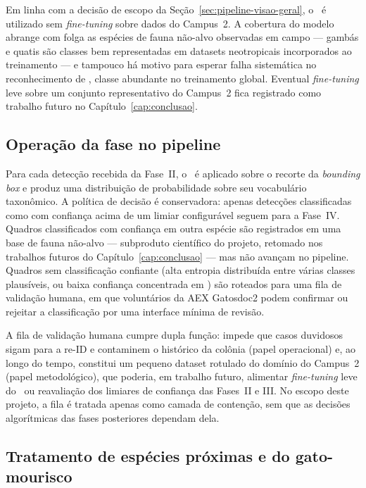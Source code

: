 Em linha com a decisão de escopo da Seção~\ref{sec:pipeline-visao-geral}, o \modeloSN~é utilizado sem \emph{fine-tuning} sobre dados do Campus~2. A cobertura do modelo abrange com folga as espécies de fauna não-alvo observadas em campo --- gambás e quatis são classes bem representadas em datasets neotropicais incorporados ao treinamento --- e tampouco há motivo para esperar falha sistemática no reconhecimento de , classe abundante no treinamento global. Eventual \emph{fine-tuning} leve sobre um conjunto representativo do Campus~2 fica registrado como trabalho futuro no Capítulo~\ref{cap:conclusao}.

\subsection*{Operação da fase no pipeline}

Para cada detecção recebida da Fase~II, o \modeloSN~é aplicado sobre o recorte da \emph{bounding box} e produz uma distribuição de probabilidade sobre seu vocabulário taxonômico. A política de decisão é conservadora: apenas detecções classificadas como  com confiança acima de um limiar configurável seguem para a Fase~IV. Quadros classificados com confiança em outra espécie são registrados em uma base de fauna não-alvo --- subproduto científico do projeto, retomado nos trabalhos futuros do Capítulo~\ref{cap:conclusao} --- mas não avançam no pipeline. Quadros sem classificação confiante (alta entropia distribuída entre várias classes plausíveis, ou baixa confiança concentrada em ) são roteados para uma fila de validação humana, em que voluntários da AEX Gatosdoc2 podem confirmar ou rejeitar a classificação por uma interface mínima de revisão.

A fila de validação humana cumpre dupla função: impede que casos duvidosos sigam para a re-ID e contaminem o histórico da colônia (papel operacional) e, ao longo do tempo, constitui um pequeno dataset rotulado do domínio do Campus~2 (papel metodológico), que poderia, em trabalho futuro, alimentar \emph{fine-tuning} leve do \modeloSN~ou reavaliação dos limiares de confiança das Fases~II e III. No escopo deste projeto, a fila é tratada apenas como camada de contenção, sem que as decisões algorítmicas das fases posteriores dependam dela.

\subsection*{Tratamento de espécies próximas e do gato-mourisco}

